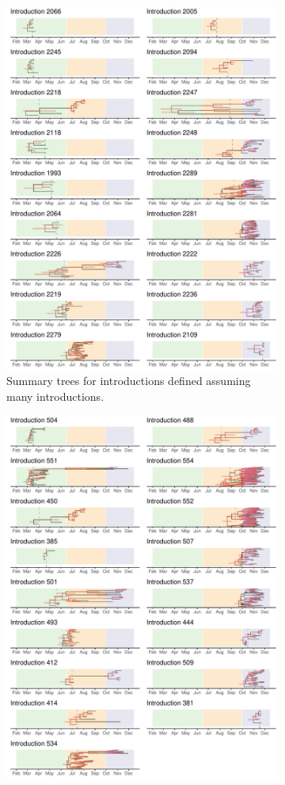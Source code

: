 \documentclass[9pt,twoside,lineno]{pnas-new}
\begin{document}
\begin{landscape}
\begin{figure}[h!]
\centering
\begin{subfigure}[b]{0.65\textwidth}
\centering
\includegraphics[width=0.75\linewidth]{figures/Re_skyline.max_chains.sampUB1.0.ctEst1.summary_trees.pdf}
\caption{Summary trees for introductions defined assuming many introductions.}
\end{subfigure}
\begin{subfigure}[b]{0.65\textwidth}
\centering
\includegraphics[width=0.75\linewidth]{figures/Re_skyline.min_chains.sampUB1.0.ctEst1.summary_trees.pdf}

\end{subfigure}
\end{figure}
\end{landscape}
\end{document}

